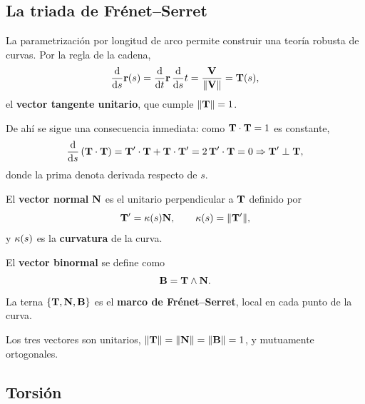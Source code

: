 \subsection{La triada de Fr\'enet--Serret}
\label{subsec:frenet_serret}

La parametrizaci\'on por longitud de arco permite construir una teor\'ia
robusta de curvas. Por la regla de la cadena,
\begin{equation}
  \label{eq:tangente_unitario}
  \frac{\mathrm{d}}{\mathrm{d}s}\mathbf{r}(s)=\frac{\mathrm{d}}{\mathrm{d}t}\mathbf{r}\,\frac{\mathrm{d}}{\mathrm{d}s}t
    =\frac{\mathbf{V}}{\lVert \mathbf{V} \rVert}=\mathbf{T}(s),
\end{equation}
el \textbf{vector tangente unitario}, que cumple $\lVert \mathbf{T} \rVert=1$.

De ah\'i se sigue una consecuencia inmediata: como
$\mathbf{T}\cdot\mathbf{T}=1$ es constante,
\begin{equation}
  \label{eq:T_perp_Tprima}
  \frac{\mathrm{d}}{\mathrm{d}s}\left( \mathbf{T}\cdot\mathbf{T} \right)
    =\mathbf{T}'\cdot\mathbf{T}+\mathbf{T}\cdot\mathbf{T}'
    =2\,\mathbf{T}'\cdot\mathbf{T}=0
  \Rightarrow \mathbf{T}'\perp\mathbf{T},
\end{equation}
donde la prima denota derivada respecto de $s$.

\begin{definicion}
  \label{def:normal_curvatura}
  El \textbf{vector normal} $\mathbf{N}$ es el unitario perpendicular a $\mathbf{T}$
  definido por
  \begin{equation}
    \label{eq:normal}
    \mathbf{T}'=\kappa(s)\mathbf{N},
    \qquad
    \kappa(s)=\lVert \mathbf{T}' \rVert,
  \end{equation}
  y $\kappa(s)$ es la \textbf{curvatura} de la curva.
\end{definicion}

\begin{definicion}[Binormal]
  \label{def:binormal}
  El \textbf{vector binormal} se define como
  \begin{equation}
    \label{eq:binormal}
    \mathbf{B}=\mathbf{T}\wedge\mathbf{N}.
  \end{equation}
  La terna $\left\{ \mathbf{T},\mathbf{N},\mathbf{B} \right\}$ es el \textbf{marco de
  Fr\'enet--Serret}, local en cada punto de la curva.
\end{definicion}

Los tres vectores son unitarios,
$\lVert \mathbf{T} \rVert=\lVert \mathbf{N} \rVert=\lVert \mathbf{B} \rVert=1$, y mutuamente ortogonales.

\subsection{Torsi\'on}
\label{subsec:torsion}

